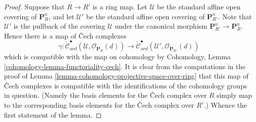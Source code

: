 \begin{proof}
Suppose that $R \to R'$ is a ring map.
Let $\mathcal{U}$ be the standard affine open covering of $\mathbf{P}^n_R$,
and let $\mathcal{U}'$ be the standard affine open covering of
$\mathbf{P}^n_{R'}$. Note that $\mathcal{U}'$ is the pullback of the covering
$\mathcal{U}$ under the canonical morphism
$\mathbf{P}^n_{R'} \to \mathbf{P}^n_R$. Hence there
is a map of {\v C}ech complexes
$$
\gamma :
\check{\mathcal{C}}_{ord}^\bullet(\mathcal{U},
\mathcal{O}_{\mathbf{P}_R}(d))
\longrightarrow
\check{\mathcal{C}}_{ord}^\bullet(\mathcal{U}',
\mathcal{O}_{\mathbf{P}_{R'}}(d))
$$
which is compatible with the map on cohomology by
Cohomology, Lemma \ref{cohomology-lemma-functoriality-cech}.
It is clear from the computations in the proof of
Lemma \ref{lemma-cohomology-projective-space-over-ring}
that this map of {\v C}ech complexes is compatible with the identifications
of the cohomology groups in question. (Namely the basis elements for
the {\v C}ech complex over $R$ simply map to the corresponding basis elements
for the {\v C}ech complex over $R'$.) Whence the first statement of the lemma.


\end{proof}
